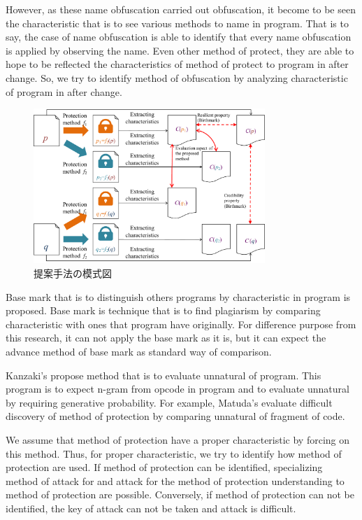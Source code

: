 \documentclass[conference]{IEEEtran}
\begin{document}
However, as these name obfuscation carried out obfuscation, it become
to be seen the characteristic that is to see various methods to name
in program.  That is to say, the case of name obfuscation is able to
identify that every name obfuscation is applied by observing the name.
Even other method of protect, they are able to hope to be reflected
the characteristics of method of protect to program in after change.
So, we try to identify method of obfuscation by analyzing
characteristic of program in after change.

\begin{figure}[b]
  \centering
  \includegraphics[width=0.78\textwidth]{images/key_idea}
  \caption{提案手法の模式図}\label{fig:keyidea}
\end{figure}


Base mark that is to distinguish others programs by characteristic in
program is proposed\cite{tamada05ieice}.  Base mark is technique that
is to find plagiarism by comparing characteristic with ones that
program have originally.  For difference purpose from this research,
it can not apply the base mark as it is, but it can expect the advance
method of base mark as standard way of comparison.

Kanzaki's propose method that is to evaluate unnatural of
program\cite{kanzaki14ipsj}.  This program is to expect n-gram from
opcode in program and to evaluate unnatural by requiring generative
probability.  For example, Matuda's evaluate difficult discovery of
method of protection by comparing unnatural of fragment of
code\cite{matsuda15ipsj}.

We assume that method of protection have a proper characteristic by
forcing on this method.  Thus, for proper characteristic, we try to
identify how method of protection are used.  If method of protection
can be identified, specializing method of attack for and attack for
the method of protection understanding to method of protection are
possible.  Conversely, if method of protection can not be identified,
the key of attack can not be taken and attack is difficult.
\end{document}
